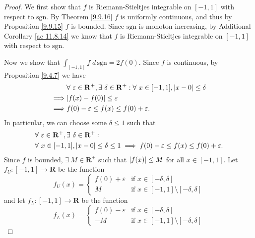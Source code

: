 \begin{proof}
    We first show that \(f\) is Riemann-Stieltjes integrable on \([-1, 1]\) with respect to \(\text{sgn}\).
    By Theorem \ref{9.9.16} \(f\) is uniformly continuous, and thus by Proposition \ref{9.9.15} \(f\) is bounded.
    Since \(\text{sgn}\) is monoton increasing, by Additional Corollary \ref{ac 11.8.14} we know that \(f\) is Riemann-Stieltjes integrable on \([-1, 1]\) with respect to \(\text{sgn}\).

    Now we show that \(\int_{[-1, 1]} f \; d \, \text{sgn} = 2f(0)\).
    Since \(f\) is continuous, by Proposition \ref{9.4.7} we have
    \begin{align*}
                 & \forall\ \varepsilon \in \mathbf{R}^+, \exists\ \delta \in \mathbf{R}^+ : \forall\ x \in [-1, 1], \abs*{x - 0} \leq \delta \\
        \implies & \abs*{f(x) - f(0)} \leq \varepsilon                                                                                        \\
        \implies & f(0) - \varepsilon \leq f(x) \leq f(0) + \varepsilon.
    \end{align*}
    In particular, we can choose some \(\delta \leq 1\) such that
    \begin{align*}
         & \forall\ \varepsilon \in \mathbf{R}^+, \exists\ \delta \in \mathbf{R}^+ :                                              \\
         & \forall\ x \in [-1, 1], \abs*{x - 0} \leq \delta \leq 1 \implies f(0) - \varepsilon \leq f(x) \leq f(0) + \varepsilon.
    \end{align*}
    Since \(f\) is bounded, \(\exists\ M \in \mathbf{R}^+\) such that \(\abs*{f(x)} \leq M\) for all \(x \in [-1, 1]\).
    Let \(f_U : [-1, 1] \to \mathbf{R}\) be the function
    \[
        f_U(x) = \begin{cases}
            f(0) + \varepsilon & \text{if } x \in [-\delta, \delta]                   \\
            M                  & \text{if } x \in [-1, 1] \setminus [-\delta, \delta]
        \end{cases}
    \]
    and let \(f_L : [-1, 1] \to \mathbf{R}\) be the function
    \[
        f_L(x) = \begin{cases}
            f(0) - \varepsilon & \text{if } x \in [-\delta, \delta]                   \\
            -M                 & \text{if } x \in [-1, 1] \setminus [-\delta, \delta]
        \end{cases}
\]
\end{proof}
